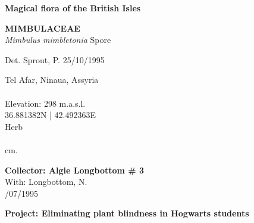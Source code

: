\documentclass[
]{article}
\begin{document}
\pagebreak
\begin{mdframed}[linewidth=2pt,linecolor=black, innerleftmargin = 1.5 cm, innerrightmargin = 1.5 cm]

\begin{center}
\bigskip
{\fontsize{30pt}{100pt}\selectfont\bf Magical flora of the British Isles } \\
\end{center}
\begin{flushright}
\begin{minipage}[c][20ex][c]{15em}  
\end{minipage}
\end{flushright}
\begin{flushleft}
{\fontsize{35pt}{100pt}\selectfont\bf MIMBULACEAE  } \\
\vfill
{\fontsize{35pt}{100pt}\selectfont\emph{ Mimbulus mimbletonia }  Spore } \\
\end{flushleft}
\begin{flushright}
{\fontsize{22.55pt}{100pt}\selectfont Det. Sprout, P.   25/10/1995 } \\
\end{flushright}
\vfill
\bigskip
\bigskip
\begin{flushleft}
{\fontsize{25pt}{100pt}\selectfont Tel Afar, Ninaua, Assyria } \\
{\fontsize{25pt}{100pt}\selectfont ~ } \\
{\fontsize{25pt}{100pt}\selectfont Elevation: 298 m.a.s.l. }\\
{\fontsize{25pt}{100pt}\selectfont 36.881382N  |  42.492363E } \\
\vfill
{\fontsize{25pt}{100pt}\selectfont Herb } \\
{\fontsize{25pt}{100pt}\selectfont ~ } \\
{\fontsize{25pt}{100pt} cm. } \\
\end{flushleft}
\vfill
\begin{flushright}
{\fontsize{20pt}{100pt}\selectfont\bf Collector:  Algie Longbottom  \# 3 } \\
{\fontsize{20pt}{100pt}\selectfont With:  Longbottom, N. } \\
{\fontsize{20pt}{100pt}/07/1995 } \\
\end{flushright}
\vfill
\begin{center}
{\fontsize{25pt}{80pt}\selectfont\bf  Project: Eliminating plant blindness in Hogwarts students } \\
\end{center}
\end{mdframed}

\pagebreak
\end{document}
